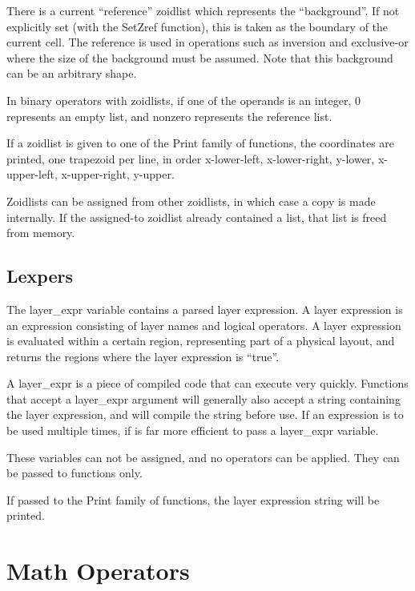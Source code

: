 There is a current ``reference'' zoidlist which represents the
``background''.  If not explicitly set (with the {\vt SetZref}
function), this is taken as the boundary of the current cell.  The
reference is used in operations such as inversion and exclusive-or
where the size of the background must be assumed.  Note that this
background can be an arbitrary shape.

In binary operators with zoidlists, if one of the operands is an
integer, 0 represents an empty list, and nonzero represents the
reference list.

If a zoidlist is given to one of the {\vt Print} family of functions,
the coordinates are printed, one trapezoid per line, in order
x-lower-left, x-lower-right, y-lower, x-upper-left, x-upper-right,
y-upper.

Zoidlists can be assigned from other zoidlists, in which case a copy
is made internally.  If the assigned-to zoidlist already contained a
list, that list is freed from memory.

\subsection{Lexpers}

The layer\_expr variable contains a parsed layer expression.  A layer
expression is an expression consisting of layer names and logical
operators.  A layer expression is evaluated within a certain region,
representing part of a physical layout, and returns the regions where
the layer expression is ``true''.

A layer\_expr is a piece of compiled code that can execute very
quickly.  Functions that accept a layer\_expr argument will generally
also accept a string containing the layer expression, and will compile
the string before use.  If an expression is to be used multiple times,
if is far more efficient to pass a layer\_expr variable.

These variables can not be assigned, and no operators can be applied. 
They can be passed to functions only.

If passed to the {\vt Print} family of functions, the layer
expression string will be printed.


\section{Math Operators}
\label{mathops}

